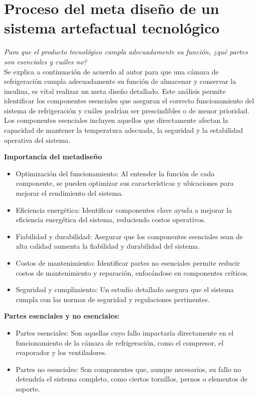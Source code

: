 \section{Proceso del meta diseño de un sistema artefactual tecnológico}

\textit{Para que el producto tecnológico cumpla adecuadamente su función, ¿qué partes son esenciales y cuáles no?}\\


Se explica a continuación de acuerdo al autor \cite{de-leon-no-date} para que una cámara de refrigeración cumpla adecuadamente su función de almacenar y conservar la insulina, es vital realizar un meta diseño detallado. Este análisis permite identificar los componentes esenciales que aseguran el correcto funcionamiento del sistema de refrigeración y cuáles podrían ser prescindibles o de menor prioridad. Los componentes esenciales incluyen aquellos que directamente afectan la capacidad de mantener la temperatura adecuada, la seguridad y la estabilidad operativa del sistema.

\textbf{Importancia del metadiseño}
\begin{itemize}
	\item Optimización del funcionamiento: Al entender la función de cada componente, se pueden optimizar sus características y ubicaciones para mejorar el rendimiento del sistema.
	\item Eficiencia energética: Identificar componentes clave ayuda a mejorar la eficiencia energética del sistema, reduciendo costos operativos.
	\item Fiabilidad y durabilidad: Asegurar que los componentes esenciales sean de alta calidad aumenta la fiabilidad y durabilidad del sistema.
	\item Costos de mantenimiento: Identificar partes no esenciales permite reducir costos de mantenimiento y reparación, enfocándose en componentes críticos.
	\item Seguridad y cumplimiento: Un estudio detallado asegura que el sistema cumpla con las normas de seguridad y regulaciones pertinentes.
	
\end{itemize}


\textbf{Partes esenciales y no esenciales:}
\begin{itemize}
	\item Partes esenciales: Son aquellas cuyo fallo impactaría directamente en el funcionamiento de la cámara de refrigeración, como el compresor, el evaporador y los ventiladores.
	
	\item Partes no esenciales: Son componentes que, aunque necesarios, su fallo no detendría el sistema completo, como ciertos tornillos, pernos o elementos de soporte.
\end{itemize}

